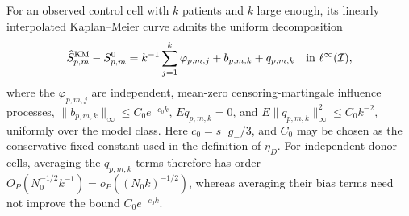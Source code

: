For an observed control cell with \(k\) patients and \(k\) large enough, its linearly interpolated Kaplan--Meier curve admits the uniform decomposition
\[
 \widehat S^{\mathrm{KM}}_{p,m}-S^0_{p,m}
 =k^{-1}\sum_{j=1}^{k}\varphi_{p,m,j}+b_{p,m,k}+q_{p,m,k}
 \quad\hbox{in }\ell^\infty(\mathcal I),
\]
where the \(\varphi_{p,m,j}\) are independent, mean-zero censoring-martingale influence processes, \(\|b_{p,m,k}\|_\infty\le C_0e^{-c_0k}\), \(E q_{p,m,k}=0\), and \(E\|q_{p,m,k}\|_\infty^2\le C_0k^{-2}\), uniformly over the model class.  Here \(c_0=s_-g_-/3\), and \(C_0\) may be chosen as the conservative fixed constant used in the definition of \(\eta_D\).  For independent donor cells, averaging the \(q_{p,m,k}\) terms therefore has order \(O_P(N_0^{-1/2}k^{-1})=o_P((N_0k)^{-1/2})\), whereas averaging their bias terms need not improve the bound \(C_0e^{-c_0k}\).